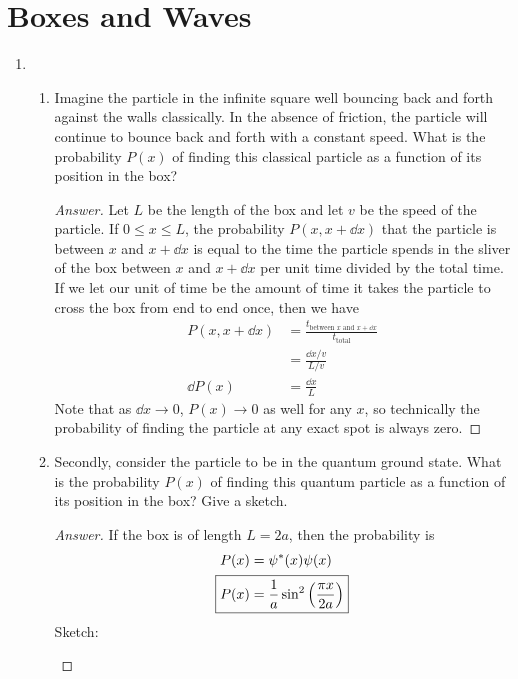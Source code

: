 \documentclass[../psets.tex]{subfiles}
\begin{document}
\section{Boxes and Waves}
\begin{enumerate}
    \item {}
    \vspace{-2em}
    \begin{enumerate}
        \item Imagine the particle in the infinite square well bouncing back and forth against the walls classically. In the absence of friction, the particle will continue to bounce back and forth with a constant speed. What is the probability $P(x)$ of finding this classical particle as a function of its position in the box?
        \begin{proof}[Answer]
            Let $L$ be the length of the box and let $v$ be the speed of the particle. If $0\leq x\leq L$, the probability $P(x,x+\dd{x})$ that the particle is between $x$ and $x+\dd{x}$ is equal to the time the particle spends in the sliver of the box between $x$ and $x+\dd{x}$ per unit time divided by the total time. If we let our unit of time be the amount of time it takes the particle to cross the box from end to end once, then we have
            \begin{align*}
                P(x,x+\dd{x}) &= \frac{t_\text{between $x$ and $x+\dd{x}$}}{t_\text{total}}\\
                &= \frac{\dd{x}/v}{L/v}\\
                \dd{P(x)} &= \frac{\dd{x}}{L}
            \end{align*}
            Note that as $\dd{x}\to 0$, $P(x)\to 0$ as well for any $x$, so technically the probability of finding the particle at any exact spot is always zero.
        \end{proof}
        \item Secondly, consider the particle to be in the quantum ground state. What is the probability $P(x)$ of finding this quantum particle as a function of its position in the box? Give a sketch.
        \begin{proof}[Answer]
            If the box is of length $L=2a$, then the probability is
            \begin{align*}
                P(x) &= \psi^*(x)\psi(x)\\
                \Aboxed{P(x) &= \frac{1}{a}\sin^2\left( \frac{\pi x}{2a} \right)}
            \end{align*}
            Sketch:
            \begin{center}
\end{center}
\end{proof}
\end{enumerate}
\end{enumerate}
\end{document}
